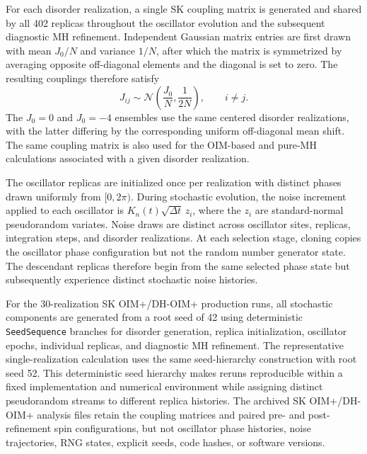 \documentclass[
reprint,
amsmath,amssymb,
aps,
pre,
floatfix,
]{revtex4-2}
\begin{document}
For each disorder realization, a single SK coupling matrix is generated and
shared by all 402 replicas throughout the oscillator evolution and the
subsequent diagnostic MH refinement. Independent Gaussian matrix entries are
first drawn with mean $J_0/N$ and variance $1/N$, after which the matrix is
symmetrized by averaging opposite off-diagonal elements and the diagonal is
set to zero. The resulting couplings therefore satisfy
\begin{equation}
J_{ij}\sim
\mathcal{N}\!\left(\frac{J_0}{N},\frac{1}{2N}\right),
\qquad i\neq j .
\end{equation}
The $J_0=0$ and $J_0=-4$ ensembles use the same centered disorder
realizations, with the latter differing by the corresponding uniform
off-diagonal mean shift. The same coupling matrix is also used for the
OIM-based and pure-MH calculations associated with a given disorder
realization.

The oscillator replicas are initialized once per realization with distinct
phases drawn uniformly from $[0,2\pi)$. During stochastic evolution, the
noise increment applied to each oscillator is
$K_n(t)\sqrt{\Delta t}\,z_i$, where the $z_i$ are standard-normal
pseudorandom variates. Noise draws are distinct across oscillator sites,
replicas, integration steps, and disorder realizations. At each selection
stage, cloning copies the oscillator phase configuration but not the random
number generator state. The descendant replicas therefore begin from the
same selected phase state but subsequently experience distinct stochastic
noise histories.

For the 30-realization SK OIM+/DH-OIM+ production runs, all stochastic
components are generated from a root seed of 42 using deterministic
\texttt{SeedSequence} branches for disorder generation, replica
initialization, oscillator epochs, individual replicas, and diagnostic MH
refinement. The representative single-realization calculation uses the same
seed-hierarchy construction with root seed 52. This deterministic seed
hierarchy makes reruns reproducible within a fixed implementation and
numerical environment while assigning distinct pseudorandom streams to
different replica histories. The archived SK OIM+/DH-OIM+ analysis files
retain the coupling matrices and paired pre- and post-refinement spin
configurations, but not oscillator phase histories, noise trajectories, RNG
states, explicit seeds, code hashes, or software versions.
\end{document}
